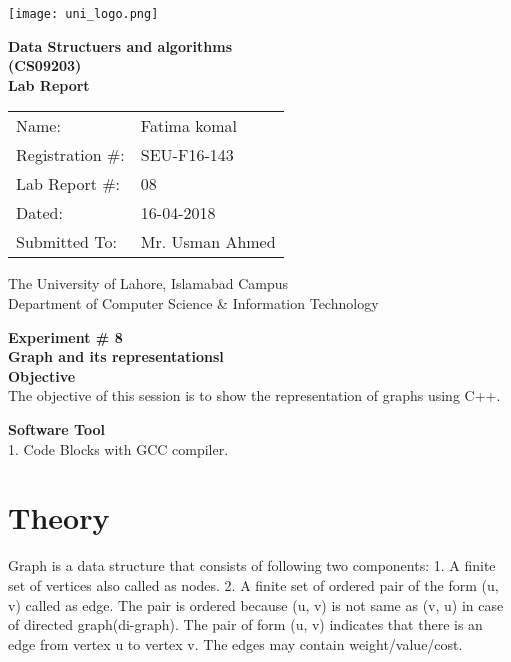 \documentclass[11pt]{article}            %
\begin{document}
\begin{titlepage}
    \centering
  \vfill
    \texttt{[image: uni\_logo.png]} \\ 
	\vskip2cm
    {\bfseries\Large
	Data Structuers and algorithms \\ (CS09203)\\
	
	\vskip2cm
	Lab Report 
	 
	\vskip2cm
	}    

\begin{center}
\begin{tabular}{ l l  } 

Name: & Fatima komal \\ 
Registration \#: & SEU-F16-143 \\ 
Lab Report \#: & 08 \\ 
 Dated:& 16-04-2018\\ 
Submitted To:& Mr. Usman Ahmed\\ 

\end{tabular}
\end{center}
    \vfill
    The University of Lahore, Islamabad Campus\\
Department of Computer Science \& Information Technology
\end{titlepage}


    
    {\bfseries\Large
\centering
	Experiment \# 8 \\

Graph and its representationsl \\
	
	}    
 \vskip1cm
 \textbf {Objective}\\ The objective of this session is to show the representation of graphs using C++. 
 
 \textbf {Software Tool} \\
 1. Code Blocks with GCC compiler.

\section{Theory }              

Graph is a data structure that consists of following two components:
1. A finite set of vertices also called as nodes.
2. A finite set of ordered pair of the form (u, v) called as edge. The pair is ordered because (u, v) is not same as (v, u) in case of directed graph(di-graph). The pair of form (u, v) indicates that there is an edge from vertex u to vertex v. The edges may contain weight/value/cost.
\end{document}
